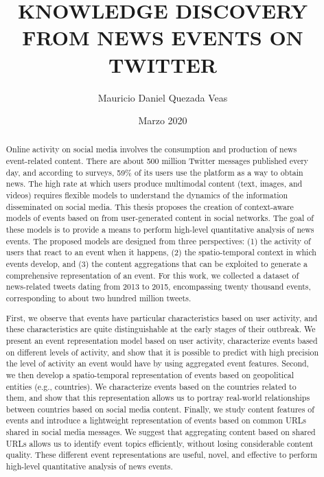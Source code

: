 \documentclass[upright, contnum]{umemoria}
\author{Mauricio Daniel Quezada Veas}
\title{\bf KNOWLEDGE DISCOVERY FROM NEWS EVENTS ON TWITTER}
\date{Marzo 2020}
\begin{document}
\frontmatter
\maketitle 

\begin{abstract} 

    Online activity on social media involves the consumption and production of
    news event-related content. 
    There are about 500 million Twitter messages published every day, and
    according to surveys, 59\% of its users use the platform as a way to obtain
    news. 
    The high rate at which users produce multimodal content (text, images, and
    videos) requires flexible models to understand the dynamics of the
    information disseminated on social media. 
    This thesis proposes the creation of context-aware models of events based on
    from user-generated content in social networks.
    The goal of these models is to provide a means to perform high-level
    quantitative analysis of news events. 
    The proposed models are designed from three perspectives: 
    (1) the activity of users that react to an event when it happens, 
    (2) the spatio-temporal context in which events develop, and 
    (3) the content aggregations that can be exploited to generate a
    comprehensive representation of an event. 
    For this work, we collected a dataset of news-related tweets dating from
    2013 to 2015, encompassing twenty thousand events, corresponding to about
    two hundred million tweets.

    First, we observe that events have particular characteristics based on user
    activity, and these characteristics are quite distinguishable at the early
    stages of their outbreak.
    We present an event representation model based on user activity,
    characterize events based on different levels of activity, and show that it
    is possible to predict with high precision the level of activity an event
    would have by using aggregated event features.
    Second, we then develop a spatio-temporal representation of events based on
    geopolitical entities (e.g., countries).
    We characterize events based on the countries related to them, and show that
    this representation allows us to portray real-world relationships between
    countries based on social media content.
    Finally, we study content features of events and introduce a lightweight
    representation of events based on common URLs shared in social media
    messages.
    We suggest that aggregating content based on shared URLs allows us to
    identify event topics efficiently, without losing considerable content
    quality.
    These different event representations are useful, novel, and effective to
    perform high-level quantitative analysis of news events.

\end{abstract}
\end{document}
